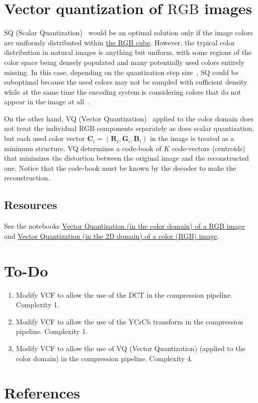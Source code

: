 \section{Vector quantization of $\text{RGB}$ images}

SQ (Scalar
Quantization)~\cite{vruiz__scalar_quantization,sayood2017introduction}
would be an optimal solution only if the image colors are uniformly
distributed within
\href{https://en.wikipedia.org/wiki/RGB_color_model}{the RGB
  cube}. However, the typical color distribution in natural images is
anything but uniform, with some regions of the color space being
densely populated and many potentially used colors entirely
missing. In this case, depending on the quantization step
size~\cite{vruiz__signal_quantization}, SQ could be suboptimal because
the used colors may not be sampled with suﬃcient density while at the
same time the encoding system is considering colors that do not appear
in the image at all~\cite{burger2016digital}.

On the other hand, VQ (Vector
Quantization)~\cite{vruiz__vector_quantization,sayood2017introduction}
applied to the color domain does not treat the individual $\text{RGB}$
components separately as does scalar quantization, but each used color
vector ${\mathbf C}_i = ({\mathbf R}_i, {\mathbf G}_i, {\mathbf B}_i
)$ in the image is treated as a minimum structure. VQ determines a
code-book of $K$ code-vectors (centroids) that minimizes the
distortion between the original image and the reconstructed
one. Notice that the code-book must be known by the decoder to make
the reconstruction.

\subsection*{Resources}
See the notebooks
\href{https://github.com/vicente-gonzalez-ruiz/vector_quantization/blob/main/docs/RGB_VQ.ipynb}{Vector
  Quantization (in the color domain) of a RGB image} and
\href{https://github.com/vicente-gonzalez-ruiz/vector_quantization/blob/main/docs/spatial_color_VQ.ipynb}{Vector
  Quantization (in the 2D domain) of a color (RGB) image}.

\section{To-Do}
\begin{enumerate}
\item Modify VCF to allow the use of the $\text{DCT}$ in the
  compression pipeline. Complexity 1.
\item Modify VCF to allow the use of the $\text{YCrCb}$ transform in
  the compression pipeline. Complexity 1.
\item Modify VCF to allow the use of VQ (Vector Quantization) (applied to
  the color domain) in the compression pipeline. Complexity 4.
\end{enumerate}

\section{References}

\renewcommand{\addcontentsline}[3]{}%

